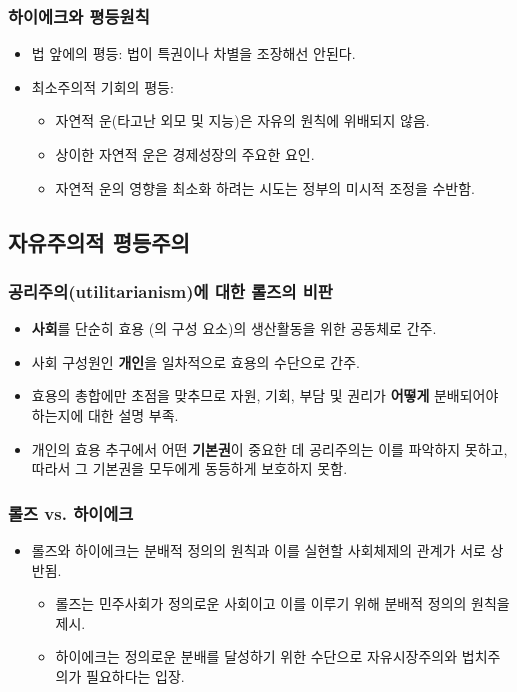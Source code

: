 \documentclass[aspectratio=169,xcolor=dvipsnames,handout]{beamer}
\begin{document}
\begin{frame}[<+->]
\frametitle{하이에크와 평등원칙}
    \begin{itemize}
        \item 법 앞에의 평등: 법이 특권이나 차별을 조장해선 안된다.
        \item 최소주의적 기회의 평등:
        \begin{itemize}
            \item  자연적 운(타고난 외모 및 지능)은 자유의 원칙에 위배되지 않음.
            \item  상이한 자연적 운은 경제성장의 주요한 요인.
            \item  자연적 운의 영향을 최소화 하려는 시도는 정부의 미시적 조정을 수반함.
        \end{itemize}
    \end{itemize}
\end{frame}

\subsection{자유주의적 평등주의}%
\begin{frame}[<+->]
\frametitle{공리주의(utilitarianism)에 대한 롤즈의 비판}
    \begin{itemize}
        \item \textbf{사회}를 단순히 효용 (의 구성 요소)의 생산활동을 위한 공동체로 간주.
        \item 사회 구성원인 \textbf{개인}을 일차적으로 효용의 수단으로 간주.
        \item 효용의 총합에만 초점을 맞추므로 자원, 기회, 부담 및 권리가 \textbf{어떻게} 분배되어야 하는지에 대한 설명 부족.
        \item 개인의 효용 추구에서 어떤 \textbf{기본권}이 중요한 데 공리주의는 이를 파악하지 못하고, 따라서 그 기본권을 모두에게 동등하게 보호하지 못함.
    \end{itemize}
\end{frame}
 
\begin{frame}[<+->]
\frametitle{롤즈 vs. 하이에크}
    \begin{itemize}
        \item 롤즈와 하이에크는 분배적 정의의 원칙과 이를 실현할 사회체제의 관계가 서로 상반됨.
        \begin{itemize}
            \item  롤즈는 민주사회가 정의로운 사회이고 이를 이루기 위해 분배적 정의의 원칙을 제시. 
            \item  하이에크는 정의로운 분배를 달성하기 위한 수단으로 자유시장주의와 법치주의가 필요하다는 입장. 
        \end{itemize}
    \end{itemize}
\end{frame}
\end{document}
